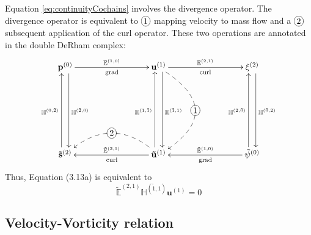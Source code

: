 Equation \eqref{eq:continuityCochains} involves the divergence operator. The divergence operator is equivalent to $\xymatrix{*+[o][F-]{1}}$ mapping velocity to mass flow and a $\xymatrix{*+[o][F-]{2}}$ subsequent application of the curl operator. These two operations are annotated in the double DeRham complex: 
\begin{equation}
    \begin{gathered}
        \xymatrix@=20ex{
            \mathbf{p}^{(0)} \ar[r]^{\mathbb{E}^{(1,0)}}_{\text{grad}} \ar@<1ex>[d]^{\mathbb{H}^{(\tilde{2},0)}} & \mathbf{u}^{(1)} \ar[r]^{\mathbb{E}^{(2,1)}}_{\text{curl}} \ar @/^10ex/ @{-->} [d]|-*+[o][F-]{1} \ar@<1ex>[d]^{\mathbb{H}^{(\tilde{1},1)}} & \mathbf{\xi}^{(2)} \ar@<1ex>[d]^{\mathbb{H}^{(\tilde{0},2)}} \\
            \mathbf{\tilde{s}}^{(2)} \ar@<1ex>[u]^{\mathbb{H}^{(0,\tilde{2})}} & \mathbf{\tilde{u}}^{(1)} \ar[l]_{\tilde{\mathbb{E}}^{(2, 1)}}^{\text{curl}} \ar @/_6ex/ @{-->} [l]|-*+[o][F-]{2} \ar@<1ex>[u]^{\mathbb{H}^{(1,\tilde{1})}} & \mathbf{\tilde{\psi}}^{(0)} \ar[l]_{\tilde{\mathbb{E}}^{(1,0)}}^{\text{grad}} \ar@<1ex>[u]^{\mathbb{H}^{(2,\tilde{0})}}
        }
    \end{gathered}
    \label{eq:DeRhamMassConservation}
\end{equation}
Thus, Equation (3.13a) is equivalent to
\begin{equation}
    \tilde{\mathbb{E}}^{(2,1)} \mathbb{H}^{(\tilde{1},1)} \mathbf{u}^{(1)} = 0
\end{equation}

\subsection{Velocity-Vorticity relation}

